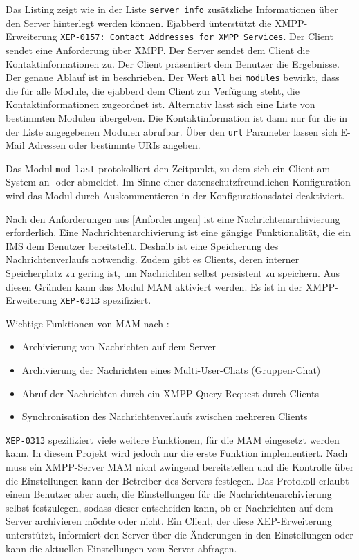 \documentclass[a4paper,titlepage,halfparskip,12pt]{scrreprt}
\begin{document}
\begin{onehalfspacing}
Das Listing zeigt wie in der Liste \texttt{server\_info} zusätzliche Informationen über den Server hinterlegt werden können. Ejabberd ünterstützt die \ac{XMPP}-Erweiterung \texttt{XEP-0157: Contact Addresses for XMPP Services}. Der Client sendet eine Anforderung über \ac{XMPP}. Der Server sendet dem Client die Kontaktinformationen zu. Der Client präsentiert dem Benutzer die Ergebnisse. Der genaue Ablauf ist in  \cite{xepContactInformation} beschrieben. Der Wert \texttt{all} bei \texttt{modules} bewirkt, dass die für alle Module, die ejabberd dem Client zur Verfügung steht, die Kontaktinformationen zugeordnet ist. Alternativ lässt sich eine Liste von bestimmten Modulen übergeben. Die Kontaktinformation ist dann nur für die in der Liste angegebenen Modulen abrufbar. Über den \texttt{url} Parameter lassen sich E-Mail Adressen oder bestimmte \ac{URI}s angeben.

Das Modul \texttt{mod\_last} protokolliert den Zeitpunkt, zu dem sich ein Client am System an- oder abmeldet. Im Sinne einer datenschutzfreundlichen Konfiguration wird das Modul durch Auskommentieren in der Konfigurationsdatei deaktiviert.

Nach den Anforderungen aus \autoref{Anforderungen} ist eine Nachrichtenarchivierung erforderlich. Eine Nachrichtenarchivierung ist eine gängige Funktionalität, die ein \acs{IMS} dem Benutzer bereitstellt. Deshalb ist eine Speicherung des Nachrichtenverlaufs notwendig. Zudem gibt es Clients, deren interner Speicherplatz zu gering ist, um Nachrichten selbst persistent zu speichern. Aus diesen Gründen kann das Modul \ac{MAM} aktiviert werden. Es ist in der \ac{XMPP}-Erweiterung \texttt{XEP-0313} spezifiziert.\cite{xepMAM}

Wichtige Funktionen von \ac{MAM} nach \cite{xepMAM}:

\begin{itemize}
\item Archivierung von Nachrichten auf dem Server
\item Archivierung der Nachrichten eines Multi-User-Chats (Gruppen-Chat)
\item Abruf der Nachrichten durch ein \ac{XMPP}-Query Request durch Clients
\item Synchronisation des Nachrichtenverlaufs zwischen mehreren Clients
\end{itemize}

\texttt{XEP-0313} spezifiziert viele weitere Funktionen, für die \ac{MAM} eingesetzt werden kann. In diesem Projekt wird jedoch nur die erste Funktion implementiert. Nach \cite{xepMAM} muss ein \ac{XMPP}-Server \ac{MAM} nicht zwingend bereitstellen und die Kontrolle über die Einstellungen kann der Betreiber des Servers festlegen. Das Protokoll erlaubt einem Benutzer aber auch, die Einstellungen für die Nachrichtenarchivierung selbst festzulegen, sodass dieser entscheiden kann, ob er Nachrichten auf dem Server archivieren möchte oder nicht. Ein Client, der diese XEP-Erweiterung unterstützt, informiert den Server über die Änderungen in den Einstellungen oder kann die aktuellen Einstellungen vom Server abfragen.\cite{xepMAM}


\end{onehalfspacing}
\end{document}
